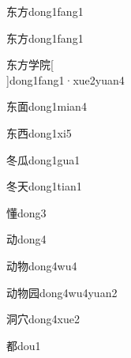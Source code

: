 \begin{verbete}[5;4]{东方}{dong1fang1}
\end{verbete}
\begin{verbete*}[5;4]{东方}{dong1fang1}
\end{verbete*}

\begin{verbete*}[5;4;8;9]{东方学院}[\\]{dong1fang1·xue2yuan4}
\end{verbete*}

\begin{verbete}[5;9]{东面}{dong1mian4}
\end{verbete}

\begin{verbete}[5;6]{东西}{dong1xi5}
\end{verbete}

\begin{verbete}[5;5]{冬瓜}{dong1gua1}
\end{verbete}

\begin{verbete}[5;4]{冬天}{dong1tian1}
\end{verbete}

\begin{verbete}[15]{懂}{dong3}
\end{verbete}

\begin{verbete}[6]{动}{dong4}
\end{verbete}

\begin{verbete}[6;8]{动物}{dong4wu4}
\end{verbete}

\begin{verbete}[6;8;7]{动物园}{dong4wu4yuan2}
\end{verbete}

\begin{verbete}[9;5]{洞穴}{dong4xue2}
\end{verbete}

\begin{verbete}[10]{都}{dou1}
\end{verbete}

